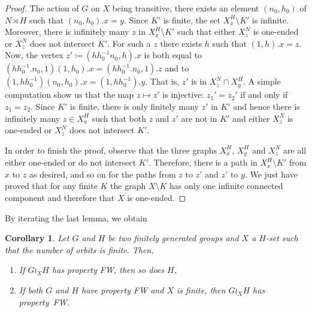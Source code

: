 \documentclass[a4paper]{article}
\newtheorem{cor}[lem]{Corollary}
\theoremstyle{definition}
\theoremstyle{remark}%
\begin{document}
\begin{proof}
The action of $G$ on $X$ being transitive, there exists an element $(n_0,h_0)$ of $N \rtimes H$ such that $(n_0,h_0).x = y$.
Since $K'$ is finite, the set $X_x^H\setminus K'$ is infinite.
Moreover, there is infinitely many $z$ in $X_x^H\setminus K'$ such that either $X_z^N$ is one-ended or $X_z^N$ does not intersect $K'$.
For such a $z$ there exists $h$ such that $(1,h).x=z$.
Now, the vertex $z'\coloneqq(hh_0^{-1}n_0,h).x$ is both equal to $(hh_0^{-1}.n_0,1)(1,h_0).x=(hh_0^{-1}.n_0,1).z$ and to $(1,hh_0^{-1})(n_0,h_0).x=(1,hh_0^{-1}).y$. That is, $z'$ is in $X_z^N\cap X_y^H$.
A simple computation show us that the map $z\mapsto z'$ is injective: $z_1'=z_2'$ if and only if $z_1=z_2$.
Since $K'$ is finite, there is only finitely many $z'$ in $K'$ and hence there is infinitely many $z\in X_x^H$ such that both $z$ and $z'$ are not in $K'$ and either $X_z^N$ is one-ended or $X_z^N$ does not intersect $K'$.

In order to finish the proof, observe that the three graphs $X_x^H$, $X_y^H$ and $X_z^N$ are all either one-ended or do not intersect $K'$.
Therefore, there is a path in $X_x^H\setminus K'$ from $x$ to $z$ as desired, and so on for the paths from $z$ to $z'$ and $z'$ to $y$.
We just have proved that for any finite $K$ the graph $X\setminus K$ has only one infinite connected component and therefore that $X$ is one-ended.
%
%
%
%
%
\end{proof}

By iterating the last lemma, we obtain
%
%
\begin{cor}\label{Cor:Wreath_ends}
Let $G$ and $H$ be two finitely generated groups and $X$ a $H$-set such that the number of orbits is finite. Then,
\begin{enumerate}
\item
If $G\wr_X H$ has property FW, then so does $H$,
\item
If both $G$ and $H$ have property FW and $X$ is finite, then $G\wr_X H$ has property~FW.
\end{enumerate}
\end{cor}
%
%
\end{document}
